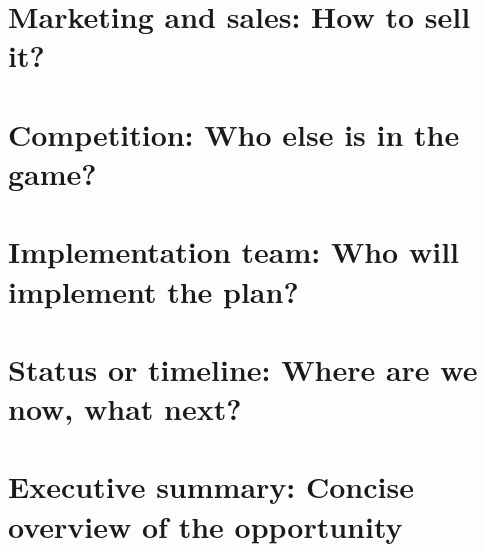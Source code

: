 \documentclass[a4paper, 11pt]{report}
\begin{document}
	{
		\FloatBarrier
		\chapter{Marketing and sales: How to sell it?}
		\label{chp:marketing}
		
	}

	{
		\FloatBarrier
		\chapter{Competition: Who else is in the game?}
		\label{chp:competition}
		
	}

	{
		\FloatBarrier
		\chapter{Implementation team: Who will implement the plan?}
		\label{chp:implementation}
		
	}

	{
		\FloatBarrier
		\chapter{Status or timeline: Where are we now, what next?}
		\label{chp:timeline}
		
	}

	{
		\FloatBarrier
		\chapter{Executive summary: Concise overview of the opportunity}
		\label{chp:summary}
		
	}

	{
		\FloatBarrier
		\newpage
		\printbibliography[title = References]
	}
\end{document}
